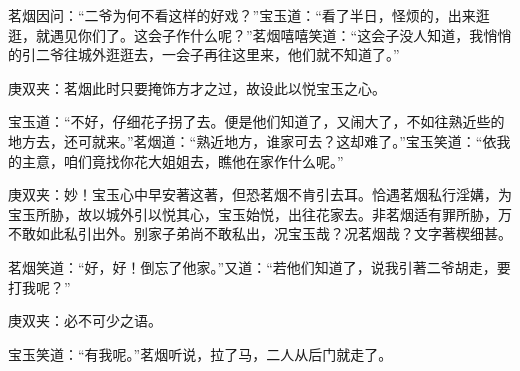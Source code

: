 \begin{parag}
    茗烟因问：“二爷为何不看这样的好戏？”宝玉道：“看了半日，怪烦的，出来逛逛，就遇见你们了。这会子作什么呢？”茗烟嘻嘻笑道：“这会子没人知道，我悄悄的引二爷往城外逛逛去，一会子再往这里来，他们就不知道了。”\begin{note}庚双夹：茗烟此时只要掩饰方才之过，故设此以悦宝玉之心。\end{note}宝玉道：“不好，仔细花子拐了去。便是他们知道了，又闹大了，不如往熟近些的地方去，还可就来。”茗烟道：“熟近地方，谁家可去？这却难了。”宝玉笑道：“依我的主意，咱们竟找你花大姐姐去，瞧他在家作什么呢。”\begin{note}庚双夹：妙！宝玉心中早安著这著，但恐茗烟不肯引去耳。恰遇茗烟私行淫媾，为宝玉所胁，故以城外引以悦其心，宝玉始悦，出往花家去。非茗烟适有罪所胁，万不敢如此私引出外。别家子弟尚不敢私出，况宝玉哉？况茗烟哉？文字著楔细甚。\end{note}茗烟笑道：“好，好！倒忘了他家。”又道：“若他们知道了，说我引著二爷胡走，要打我呢？”\begin{note}庚双夹：必不可少之语。\end{note}宝玉笑道：“有我呢。”茗烟听说，拉了马，二人从后门就走了。
\end{parag}



